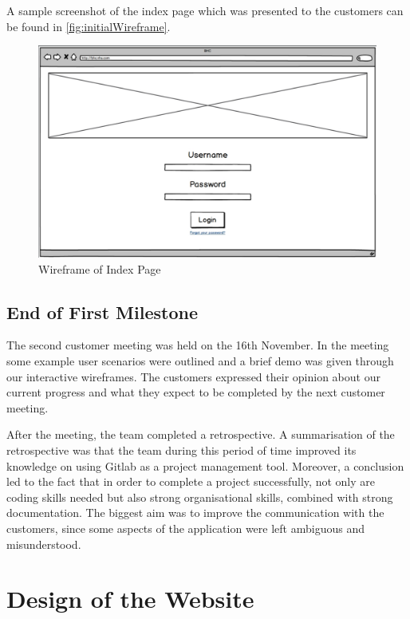 \documentclass{l3proj}
\begin{document}
A sample screenshot of the index page which was presented to the customers can be found in \autoref{fig:initialWireframe}.

\begin{figure}[ht]
\centerline{\includegraphics[width=\textwidth, height=\textheight, keepaspectratio]{wireframe.png}}
\caption{Wireframe of Index Page}
\label{fig:initialWireframe}
\end{figure}

\subsection{End of First Milestone}
\label{sec:milestone1}

The second customer meeting was held on the 16th November. In the meeting some example user scenarios were outlined and a brief demo was given through our interactive wireframes. The customers expressed their opinion about our current progress and what they expect to be completed by the next customer meeting.

After the meeting, the team completed a retrospective. A summarisation of the retrospective was that the team during this period of time improved its knowledge on using Gitlab as a project management tool. Moreover, a conclusion led to the fact that in order to complete a project successfully, not only are coding skills needed but also strong organisational skills, combined with strong documentation. The biggest aim was to improve the communication with the customers, since some aspects of the application were left ambiguous and misunderstood.


\section{Design of the Website}
\label{sec:design}
\end{document}
